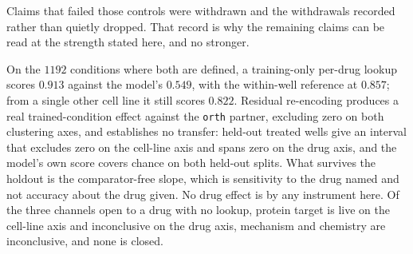 Claims that failed those controls were withdrawn and the withdrawals recorded
rather than quietly dropped. That record is why the remaining claims can be read
at the strength stated here, and no stronger.

\begin{claim}
On the $\num{1192}$ conditions where both are defined, a training-only per-drug
lookup scores $0.913$ against the model's $0.549$, with the within-well reference
at $0.857$; from a single other cell line it still scores $0.822$. Residual
re-encoding produces a real trained-condition effect against the \texttt{orth}
partner, excluding zero on both clustering axes, and establishes no transfer:
held-out treated wells give an interval that excludes zero on the cell-line axis
and spans zero on the drug axis, and the model's own score covers chance on both
held-out splits. What survives the holdout is the comparator-free slope, which is
sensitivity to the drug named and not accuracy about the drug given. No drug
effect is \shownzero by any instrument here. Of the three channels open to a drug
with no lookup, protein target is live on the cell-line axis and inconclusive on
the drug axis, mechanism and chemistry are inconclusive, and none is closed.
\end{claim}
